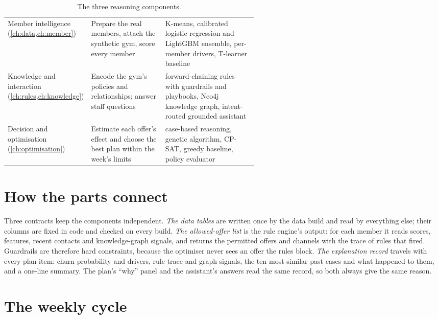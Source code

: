 \begin{table}[tb]
  \caption{The three reasoning components.}
  \label{tab:components}
  \begin{tabularx}{\linewidth}{@{}P{0.2\linewidth} L P{0.37\linewidth}@{}}
    \toprule
     &  &  \\
    \midrule
    Member intelligence (\cref{ch:data,ch:member}) & Prepare the real members, attach the synthetic gym, score every member & K-means, calibrated logistic regression and LightGBM ensemble, per-member drivers, T-learner baseline \\
    Knowledge and interaction (\cref{ch:rules,ch:knowledge}) & Encode the gym's policies and relationships; answer staff questions & forward-chaining rules with guardrails and playbooks, Neo4j knowledge graph, intent-routed grounded assistant \\
    Decision and optimisation (\cref{ch:optimisation}) & Estimate each offer's effect and choose the best plan within the week's limits & case-based reasoning, genetic algorithm, CP-SAT, greedy baseline, policy evaluator \\
    \bottomrule
  \end{tabularx}
\end{table}

\section{How the parts connect}

Three contracts keep the components independent. \emph{The data tables} are written once by the data build and read by everything else; their columns are fixed in code and checked on every build. \emph{The allowed-offer list} is the rule engine's output: for each member it reads scores, features, recent contacts and knowledge-graph signals, and returns the permitted offers and channels with the trace of rules that fired. Guardrails are therefore hard constraints, because the optimiser never sees an offer the rules block. \emph{The explanation record} travels with every plan item: churn probability and drivers, rule trace and graph signals, the ten most similar past cases and what happened to them, and a one-line summary. The plan's \enquote{why} panel and the assistant's answers read the same record, so both always give the same reason.

\section{The weekly cycle}

